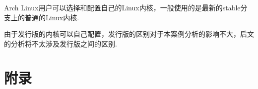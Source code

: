 \documentclass[11pt]{article}
\begin{document}
Arch Linux用户可以选择和配置自己的Linux内核，一般使用的是最新的stable分支上的普通的Linux内核.
\begin{notebox}
	由于发行版的内核可以自己配置，发行版的区别对于本案例分析的影响不大，后文的分析将不太涉及发行版之间的区别.
\end{notebox}





\section{附录}

\printbibliography[heading=bibintoc]

\printindex

\newpage
\end{document}
